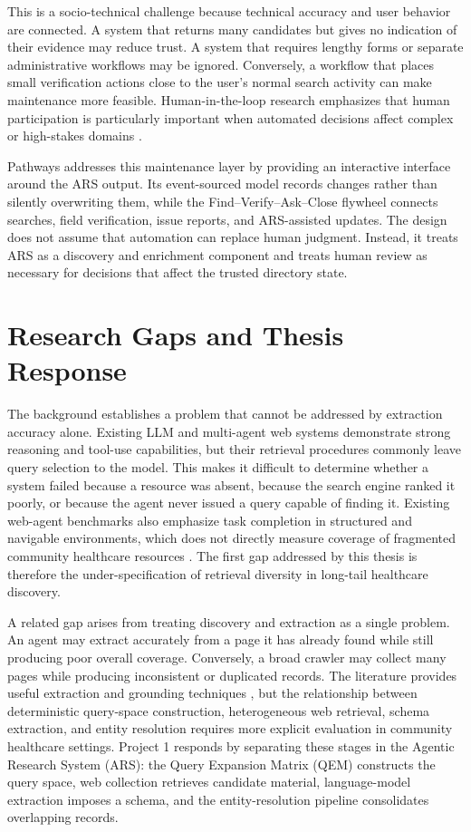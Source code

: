 \documentclass[12pt,oneside]{report}
\begin{document}
This is a socio-technical challenge because technical accuracy and user behavior are connected. A system that returns many candidates but gives no indication of their evidence may reduce trust. A system that requires lengthy forms or separate administrative workflows may be ignored. Conversely, a workflow that places small verification actions close to the user's normal search activity can make maintenance more feasible. Human-in-the-loop research emphasizes that human participation is particularly important when automated decisions affect complex or high-stakes domains \cite{47,48,51}.

Pathways addresses this maintenance layer by providing an interactive interface around the ARS output. Its event-sourced model records changes rather than silently overwriting them, while the Find--Verify--Ask--Close flywheel connects searches, field verification, issue reports, and ARS-assisted updates. The design does not assume that automation can replace human judgment. Instead, it treats ARS as a discovery and enrichment component and treats human review as necessary for decisions that affect the trusted directory state.

\section{Research Gaps and Thesis Response}
The background establishes a problem that cannot be addressed by extraction accuracy alone. Existing LLM and multi-agent web systems demonstrate strong reasoning and tool-use capabilities, but their retrieval procedures commonly leave query selection to the model. This makes it difficult to determine whether a system failed because a resource was absent, because the search engine ranked it poorly, or because the agent never issued a query capable of finding it. Existing web-agent benchmarks also emphasize task completion in structured and navigable environments, which does not directly measure coverage of fragmented community healthcare resources \cite{10,11,12,15}. The first gap addressed by this thesis is therefore the under-specification of retrieval diversity in long-tail healthcare discovery.

A related gap arises from treating discovery and extraction as a single problem. An agent may extract accurately from a page it has already found while still producing poor overall coverage. Conversely, a broad crawler may collect many pages while producing inconsistent or duplicated records. The literature provides useful extraction and grounding techniques \cite{30,36,37,40,41}, but the relationship between deterministic query-space construction, heterogeneous web retrieval, schema extraction, and entity resolution requires more explicit evaluation in community healthcare settings. Project 1 responds by separating these stages in the Agentic Research System (ARS): the Query Expansion Matrix (QEM) constructs the query space, web collection retrieves candidate material, language-model extraction imposes a schema, and the entity-resolution pipeline consolidates overlapping records.
\end{document}
